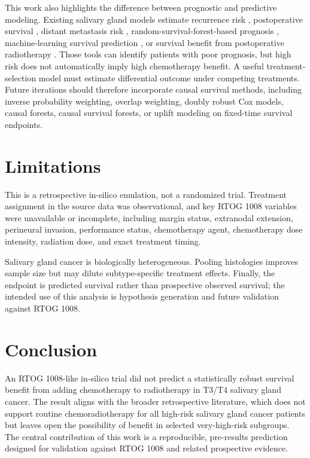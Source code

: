 \documentclass[10pt,twocolumn]{article}
\begin{document}
This work also highlights the difference between prognostic and predictive modeling. Existing salivary gland models estimate recurrence risk \cite{ref26}, postoperative survival \cite{ref27,ref28}, distant metastasis risk \cite{ref25}, random-survival-forest-based prognosis \cite{ref29}, machine-learning survival prediction \cite{ref30}, or survival benefit from postoperative radiotherapy \cite{ref31}. Those tools can identify patients with poor prognosis, but high risk does not automatically imply high chemotherapy benefit. A useful treatment-selection model must estimate differential outcome under competing treatments. Future iterations should therefore incorporate causal survival methods, including inverse probability weighting, overlap weighting, doubly robust Cox models, causal forests, causal survival forests, or uplift modeling on fixed-time survival endpoints.


\section{Limitations}

This is a retrospective in-silico emulation, not a randomized trial. Treatment assignment in the source data was observational, and key RTOG 1008 variables were unavailable or incomplete, including margin status, extranodal extension, perineural invasion, performance status, chemotherapy agent, chemotherapy dose intensity, radiation dose, and exact treatment timing.


Salivary gland cancer is biologically heterogeneous. Pooling histologies improves sample size but may dilute subtype-specific treatment effects. Finally, the endpoint is predicted survival rather than prospective observed survival; the intended use of this analysis is hypothesis generation and future validation against RTOG 1008.


\section{Conclusion}

An RTOG 1008-like in-silico trial did not predict a statistically robust survival benefit from adding chemotherapy to radiotherapy in T3/T4 salivary gland cancer. The result aligns with the broader retrospective literature, which does not support routine chemoradiotherapy for all high-risk salivary gland cancer patients but leaves open the possibility of benefit in selected very-high-risk subgroups. The central contribution of this work is a reproducible, pre-results prediction designed for validation against RTOG 1008 and related prospective evidence.
\end{document}

